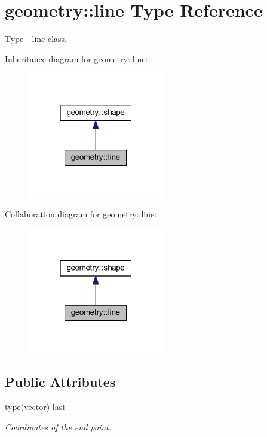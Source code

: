\hypertarget{structgeometry_1_1line}{}\section{geometry\+:\+:line Type Reference}
\label{structgeometry_1_1line}


Type -\/ line class.  




Inheritance diagram for geometry\+:\+:line\+:\nopagebreak
\begin{figure}[H]
\begin{center}
\leavevmode
\includegraphics[width=169pt]{structgeometry_1_1line__inherit__graph}
\end{center}
\end{figure}


Collaboration diagram for geometry\+:\+:line\+:\nopagebreak
\begin{figure}[H]
\begin{center}
\leavevmode
\includegraphics[width=169pt]{structgeometry_1_1line__coll__graph}
\end{center}
\end{figure}
\subsection*{Public Attributes}
\begin{DoxyCompactItemize}
\item 
type(vector) \mbox{\hyperlink{structgeometry_1_1line_ab899fb3b6da58896cd14e2f1a474c457}{last}}
\begin{DoxyCompactList}\small\item\em Coordinates of the end point. \end{DoxyCompactList}\end{DoxyCompactItemize}


